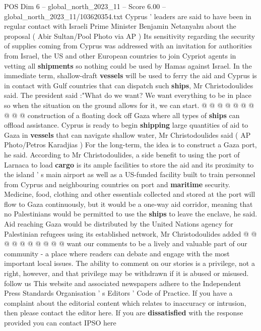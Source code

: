 \begin{textsample}{POS Dim 6 – global\_north\_2023\_11 – Score 6.00 – global\_north\_2023\_11/103620354.txt}
Cyprus ' leaders are said to have been in regular contact with Israeli Prime Minister Benjamin Netanyahu about the proposal ( Abir Sultan/Pool Photo via AP ) Its sensitivity regarding the security of supplies coming from Cyprus was addressed with an invitation for authorities from Israel, the US and other European countries to join Cypriot agents in vetting all \textbf{shipments} so nothing could be used by Hamas against Israel.
In the immediate term, shallow-draft \textbf{vessels} will be used to ferry the aid and Cyprus is in contact with Gulf countries that can dispatch such \textbf{ships}, Mr Christodoulides said.
The president said :"What do we want?
We want everything to be in place so when the situation on the ground allows for it, we can start. @ @ @ @ @ @ @ @ @ @ construction of a floating dock off Gaza where all types of \textbf{ships} can offload assistance.
Cyprus is ready to begin \textbf{shipping} large quantities of aid to Gaza in \textbf{vessels} that can navigate shallow water, Mr Christodoulides said ( AP Photo/Petros Karadjias ) For the long-term, the idea is to construct a Gaza port, he said.
According to Mr Christodoulides, a side benefit to using the port of Larnaca to load \textbf{cargo} is its ample facilities to store the aid and its proximity to the island ' s main airport as well as a US-funded facility built to train personnel from Cyprus and neighbouring countries on port and \textbf{maritime} security.
Medicine, food, clothing and other essentials collected and stored at the port will flow to Gaza continuously, but it would be a one-way aid corridor, meaning that no Palestinians would be permitted to use the \textbf{ships} to leave the enclave, he said.
Aid reaching Gaza would be distributed by the United Nations agency for Palestinian refugees using its established network, Mr Christodoulides added @ @ @ @ @ @ @ @ @ @ want our comments to be a lively and valuable part of our community - a place where readers can debate and engage with the most important local issues.
The ability to comment on our stories is a privilege, not a right, however, and that privilege may be withdrawn if it is abused or misused. follow us This website and associated newspapers adhere to the Independent Press Standards Organisation ' s Editors ' Code of Practice.
If you have a complaint about the editorial content which relates to inaccuracy or intrusion, then please contact the editor here.
If you are \textbf{dissatisfied} with the response provided you can contact IPSO here

\end{textsample}
